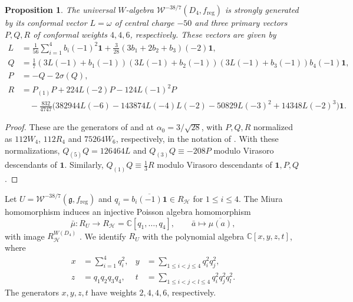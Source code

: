 \documentclass[11pt]{amsart}
\numberwithin{equation}{section}
\newtheorem{proposition}[theorem]{Proposition}
\theoremstyle{definition}
\theoremstyle{remark}
\newcommand{\CC}{\mathbb C}
\newcommand{\g}{\mathfrak g}
\newcommand{\one}{\mathbf1}
\newcommand{\W}{\mathcal W}
\newcommand{\reg}{\mathrm{reg}}
\begin{document}
\begin{proposition}\label{prop:miura-generators}
The universal $W$-algebra $\W^{-38/7}(D_4,f_{\reg})$ is strongly
generated by its conformal vector $L=\omega$ of central charge $-50$
and three primary vectors $P,Q,R$ of conformal weights $4,4,6$,
respectively. These vectors are given by
\begin{equation}\label{eq:primary-generators}
\begin{aligned}
 L&=\frac1{56}\sum_{i=1}^4 b_i(-1)^2\one
       +\frac3{28}(3b_1+2b_2+b_3)(-2)\one,\\
 Q&=\frac17(3L(-1)+b_1(-1))(3L(-1)+b_2(-1))
              (3L(-1)+b_3(-1))b_4(-1)\one,\\
 P&=-Q-2\sigma(Q),\\
 R&=P_{(1)}P+224L(-2)P-124L(-1)^2P\\
  &\quad-\frac{832}{4747}\bigl(382944L(-6)-143874L(-4)L(-2)
                        -50829L(-3)^2+14348L(-2)^3\bigr)\one .
\end{aligned}
\end{equation}
\end{proposition}
\begin{proof}
These are the generators of \cite{LF} and \cite[Section~6.3.3]{BS} at
$\alpha_0=3/\sqrt{28}$, with $P,Q,R$ normalized as
$112W_4$, $112R_4$ and $75264W_6$, respectively, in the notation of
\cite[(3.16)--(3.17), (B.10)--(B.13)]{IZ}.
With these normalizations, $Q_{(5)}Q=126464L$ and
$Q_{(3)}Q\equiv-208P$ modulo Virasoro descendants of $\one$.
Similarly, $Q_{(1)}Q\equiv\tfrac13 R$ modulo Virasoro descendants
of $\one,P,Q$.
\end{proof}

Let $U=\W^{-38/7}(\g,f_{\reg})$ and
$q_i=\overline{b_i(-1)\one}\in R_{\mathcal H}$ for $1\leq i\leq4$.
The Miura homomorphism induces an injective Poisson algebra homomorphism
\[
 \bar\mu:R_U\longrightarrow R_{\mathcal H}=\CC[q_1,\ldots,q_4],
 \qquad \bar a\longmapsto\overline{\mu(a)},
\]
with image $R_{\mathcal H}^{W(D_4)}$ \cite[(25) and Lemma~6.1(1)]{ACL}.
We identify $R_U$ with the polynomial algebra $\CC[x,y,z,t]$, where
\begin{equation}\label{eq:x-y-z-t}
\begin{aligned}
 x&=\sum_{i=1}^4q_i^2, & y&=\sum_{1\leq i<j\leq4}q_i^2q_j^2,\\
 z&=q_1q_2q_3q_4, & t&=\sum_{1\leq i<j<l\leq4}q_i^2q_j^2q_l^2.
\end{aligned}
\end{equation}
The generators $x,y,z,t$ have weights $2,4,4,6$, respectively.
\end{document}
